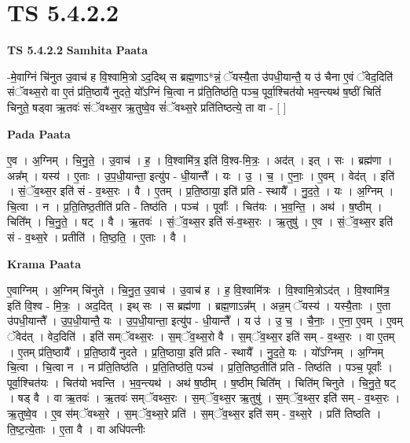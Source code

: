 \documentclass[17pt]{extarticle}
\begin{document}
\section{ TS 5.4.2.2 }

\textbf{TS 5.4.2.2 } \newline
\textbf{Samhita Paata} \newline

-मे॒वाग्निं चि॑नुत उ॒वाच॑ ह वि॒श्वामि॒त्रो ऽद॒दिथ् स ब्रह्म॒णाऽ*न्नं॒ ॅयस्यै॒ता उ॑पधी॒यान्तै॒ य उ॑ चैना ए॒वं ॅवेद॒दिति॑ संॅवथ्स॒रो वा ए॒तं प्र॑ति॒ष्ठायै॑ नुदते॒ यो᳚ऽग्निं चि॒त्वा न प्र॑ति॒तिष्ठ॑ति॒ पञ्च॒ पूर्वा॒श्चित॑यो भव॒न्त्यथ॑ ष॒ष्ठीं चितिं॑ चिनुते॒ षड्वा ऋ॒तवः॑ संॅवथ्स॒र ऋ॒तुष्वे॒व सं॑ॅवथ्स॒रे प्रति॑तिष्ठत्ये॒ ता वा - [  ] \newline

\textbf{Pada Paata} \newline

ए॒व । अ॒ग्निम् । चि॒नु॒ते॒ । उ॒वाच॑ । ह॒ । वि॒श्वामि॑त्र॒ इति॑ वि॒श्व-मि॒त्रः॒ । अद॑त् । इत् । सः । ब्रह्म॑णा । अन्न᳚म् । यस्य॑ । ए॒ताः । उ॒प॒धी॒यान्ता॒ इत्यु॑प - धी॒यान्तै᳚ । यः । उ॒ । च॒ । ए॒नाः॒ । ए॒वम् । वेद॑त् । इति॑ । सं॒ॅव॒थ्स॒र इति॑ सं - व॒थ्स॒रः । वै । ए॒तम् । प्र॒ति॒ष्ठाया॒ इति॑ प्रति - स्थायै᳚ । नु॒द॒ते॒ । यः । अ॒ग्निम् । चि॒त्वा । न । प्र॒ति॒तिष्ठ॒तीति॑ प्रति - तिष्ठ॑ति । पञ्च॑ । पूर्वाः᳚ । चित॑यः । भ॒व॒न्ति॒ । अथ॑ । ष॒ष्ठीम् । चिति᳚म् । चि॒नु॒ते॒ । षट् । वै । ऋ॒तवः॑ । सं॒ॅव॒थ्स॒र इति॑ सं-व॒थ्स॒रः । ऋ॒तुषु॑ । ए॒व । सं॒ॅव॒थ्स॒र इति॑ सं - व॒थ्स॒रे । प्रतीति॑ । ति॒ष्ठ॒ति॒ । ए॒ताः । वै ।  \newline


\textbf{Krama Paata} \newline

ए॒वाग्निम् । अ॒ग्निम् चि॑नुते । चि॒नु॒त॒ उ॒वाच॑ । उ॒वाच॑ ह । ह॒ वि॒श्वामि॑त्रः । वि॒श्वामि॒त्रोऽद॑त् । वि॒श्वामि॑त्र॒ इति॑ वि॒श्व - मि॒त्रः॒ । अद॒दित् । इथ् सः । स ब्रह्म॑णा । ब्रह्म॒णाऽन्न᳚म् । अन्न॒म् ॅयस्य॑ । यस्यै॒ताः । ए॒ता उ॑पधी॒यान्तै᳚ । उ॒प॒धी॒यान्तै॒ यः । उ॒प॒धी॒यान्ता॒ इत्यु॑प - धी॒यान्तै᳚ । य उ॑ । उ॒ च॒ । चै॒नाः॒ । ए॒ना॒ ए॒वम् । ए॒वम् ॅवेद॑त् । वेद॒दिति॑ । इति॑ सम्ॅवथ्स॒रः । स॒म्ॅव॒थ्स॒रो वै । स॒म्ॅव॒थ्स॒र इति॑ सम् - व॒थ्स॒रः । वा ए॒तम् । ए॒तम् प्र॑ति॒ष्ठायै᳚ । प्र॒ति॒ष्ठायै॑ नुदते । प्र॒ति॒ष्ठाया॒ इति॑ प्रति - स्थायै᳚ । नु॒द॒ते॒ यः । यो᳚ऽग्निम् । अ॒ग्निम् चि॒त्वा । चि॒त्वा न । न प्र॑ति॒तिष्ठ॑ति । प्र॒ति॒तिष्ठ॑ति॒ पञ्च॑ । प्र॒ति॒तिष्ठ॒तीति॑ प्रति - तिष्ठ॑ति । पञ्च॒ पूर्वाः᳚ । पूर्वा॒श्चित॑यः । चित॑यो भवन्ति । भ॒व॒न्त्यथ॑ । अथ॑ ष॒ष्ठीम् । ष॒ष्ठीम् चिति᳚म् । चिति॑म् चिनुते । चि॒नु॒ते॒ षट् । षड् वै । वा ऋ॒तवः॑ । ऋ॒तवः॑ सम्ॅवथ्स॒रः । स॒म्ॅव॒थ्स॒र ऋ॒तुषु॑ । स॒म्ॅव॒थ्स॒र इति॑ सम् - व॒थ्स॒रः । ऋ॒तुष्वे॒व । ए॒व स॑म्ॅवथ्स॒रे । स॒म्ॅव॒थ्स॒रे प्रति॑ । स॒म्ॅव॒थ्स॒र इति॑ सम् - व॒थ्स॒रे । प्रति॑ तिष्ठति । ति॒ष्ट॒त्ये॒ताः । ए॒ता वै । वा अधि॑पत्नीः \newline
\end{document}
